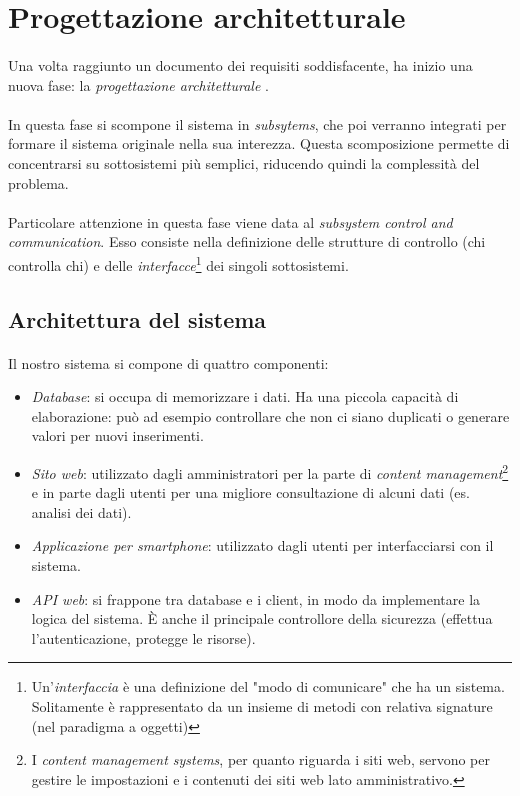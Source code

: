 \documentclass[11pt,a4paper,english]{article}
\begin{document}
\section{Progettazione architetturale}

\paragraph{} Una volta raggiunto un documento dei requisiti soddisfacente, ha inizio una nuova fase: la \emph{progettazione architetturale} \cite{prog_architetturale}. 

\paragraph{} In questa fase si scompone il sistema in \emph{subsytems}, che poi verranno integrati per formare il sistema originale nella sua interezza. Questa scomposizione permette di concentrarsi su sottosistemi più semplici, riducendo quindi la complessità del problema. 

\paragraph{} Particolare attenzione in questa fase viene data al \emph{subsystem control and communication}. Esso consiste nella definizione delle strutture di controllo (chi controlla chi) e delle \emph{interfacce}\footnote{Un'\emph{interfaccia} è una definizione del "modo di comunicare" che ha un sistema. Solitamente è rappresentato da un insieme di metodi con relativa signature (nel paradigma a oggetti)} dei singoli sottosistemi.

\subsection{Architettura del sistema}

\paragraph{} Il nostro sistema si compone di quattro componenti:
\begin{itemize}
    \item \emph{Database}: si occupa di memorizzare i dati. Ha una piccola capacità di elaborazione: può ad esempio controllare che non ci siano duplicati o generare valori per nuovi inserimenti.
    \item \emph{Sito web}: utilizzato dagli amministratori per la parte di \emph{content management}\footnote{I \emph{content management systems}, per quanto riguarda i siti web, servono per gestire le impostazioni e i contenuti dei siti web lato amministrativo.} e in parte dagli utenti per una migliore consultazione di alcuni dati (es. analisi dei dati).
    \item \emph{Applicazione per smartphone}: utilizzato dagli utenti per interfacciarsi con il sistema.
    \item \emph{API web}: si frappone tra database e i client, in modo da implementare la logica del sistema. È anche il principale controllore della sicurezza (effettua l'autenticazione, protegge le risorse). 
\end{itemize}
\end{document}
